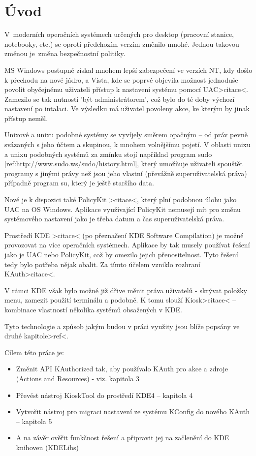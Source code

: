 \def\topfraction{.9}
\def\floatpagefraction{.8}

\chapter{Úvod}
V~moderních operačních systémech určených pro desktop (pracovní stanice,
notebooky, etc.) se oproti předchozím verzím změnilo mnohé. Jednou takovou
změnou je~změna bezpečnostní politiky.

MS Windows postupně získal mnohem lepší zabezpečení ve verzích NT, kdy došlo
k přechodu na nové jádro, a Vista, kde se poprvé objevila možnost jednoduše
povolit obyčejnému uživateli přístup k nastavení systému pomocí UAC>citace<.
Zamezilo se tak nutnosti 'být administrátorem', což bylo do té doby výchozí
nastavení po intalaci. Ve výsledku má uživatel povoleny akce, ke kterým by jinak
přístup neměl.

Unixové a unixu podobné systémy se vyvíjely směrem opačným -- od práv pevně
svázaných s jeho účtem a skupinou, k mnohem volnějšímu pojetí. V oblasti unixu
a unixu podobných systémů za zmínku stojí například program sudo
[ref:http://www.sudo.ws/sudo/history.html], který umožňuje uživateli spouštět
programy s jinými právy než jsou jeho vlastní (převážně superuživatelská práva)
případně program su, který je ještě staršího data.

Nově je k dispozici také PolicyKit >citace<, který plní podobnou úlohu jako UAC
na OS Windows. Aplikace využívající PolicyKit nemusejí mít pro změnu systémového
nastavení jako je třeba datum a čas superuživatelská práva.

Prostředí KDE >citace< (po přeznačení KDE Software Compilation) je možné
provozovat na více operačních systémech. Aplikace by tak musely používat řešení
jako je UAC nebo PolicyKit, což by omezilo jejich přenositelnost. Tyto řešení
tedy bylo potřeba nějak obalit. Za tímto účelem vzniklo rozhraní KAuth>citace<.

V rámci KDE však bylo možné již dřive měnit práva uživatelů - skrývat položky
menu, zamezit použití terminálu a podobně. K tomu slouží Kiosk>citace<
-- kombinace vlastností několika systémů obsažených v KDE.

Tyto technologie a způsob jakým budou v práci využity jsou blíže popsány ve
druhé kapitole>ref<.

Cílem této práce je:
\begin{itemize}
\item Změnit API KAuthorized tak, aby používalo KAuth pro akce a zdroje (Actions
 and Resources) - viz. kapitola 3
\item Převést nástroj KioskTool do prostředí KDE4 -- kapitola 4
\item Vytvořit nástroj pro migraci nastavení ze systému KConfig do nového KAuth
-- kapitola 5
\item A na závěr ověřit funkčnost řešení a připravit jej na začlenění do KDE
knihoven (KDELibs)
\end{itemize}

